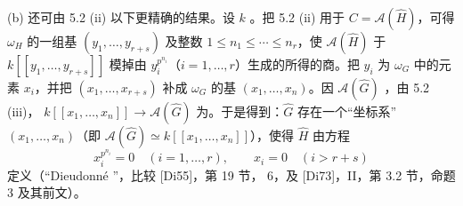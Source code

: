 (b) 还可由 5.2 (ii) 以下更精确的结果。设 $k$ 。把 5.2 (ii) 用于 $C=\mathcal A(\widehat H)$，可得 $\omega_H$ 的一组基 $(y_1,\ldots,y_{r+s})$ 及整数 $1\leq n_1\leq\cdots\leq n_r$，使 $\mathcal A(\widehat H)$ 于 $k[[y_1,\ldots,y_{r+s}]]$ 模掉由 $y_i^{p^{n_i}}$（$i=1,\ldots,r$）生成的所得的商。把 $y_i$ 为 $\omega_G$ 中的元素 $x_i$，并把 $(x_1,\ldots,x_{r+s})$ 补成 $\omega_G$ 的基 $(x_1,\ldots,x_n)$。因 $\mathcal A(\widehat G)$ ，由 5.2 (iii)， $k[[x_1,\ldots,x_n]]\to\mathcal A(\widehat G)$ 为。于是得到：$\widehat G$ 存在一个“坐标系”$(x_1,\ldots,x_n)$（即 $\mathcal A(\widehat G)\simeq k[[x_1,\ldots,x_n]]$），使得 $\widehat H$ 由方程
\[x_i^{p^{n_i}}=0\quad(i=1,\ldots,r),\qquad x_i=0\quad(i>r+s)\]
定义（“Dieudonn\'e ”，比较 [Di55]，第 19 节， 6，及 [Di73]，II，第 3.2 节，命题 3 及其前文）。

